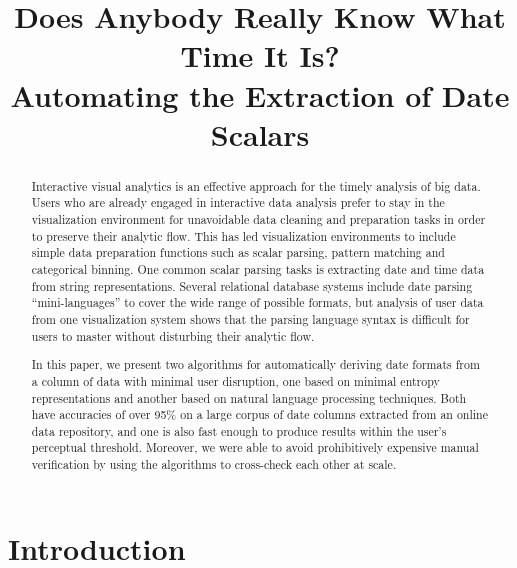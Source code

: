 \documentclass{sig-alternate-05-2015}
\newcommand{\vidya}[1]{\textcolor{red}{(vidya: #1)}}
\begin{document}
\title{Does Anybody Really Know What Time It Is?\\
Automating the Extraction of Date Scalars}


\maketitle
\begin{abstract}
Interactive visual analytics is an effective approach for the timely analysis of big data. Users who are already engaged in interactive data analysis prefer to stay in the visualization environment for unavoidable data cleaning and preparation tasks in order to preserve their analytic flow. This has led visualization environments to include simple data preparation functions such as scalar parsing, pattern matching and categorical binning. One common scalar parsing tasks is extracting date and time data from string representations. Several relational database systems include date parsing ``mini-languages'' to cover the wide range of possible formats, but analysis of user data from one visualization system shows that the parsing language syntax is difficult for users to master without disturbing their analytic flow.

In this paper, we present two algorithms for automatically deriving date formats from a column of data with minimal user disruption, one based on minimal entropy representations and another based on natural language processing techniques. Both have accuracies of over 95\% on a large corpus of date columns extracted from an online data repository, and one is also fast enough to produce results within the user's perceptual threshold. Moreover, we were able to avoid prohibitively expensive manual verification by using the algorithms to cross-check each other at scale.
\end{abstract}



\section{Introduction} \label{sec:intro}

\end{document}
